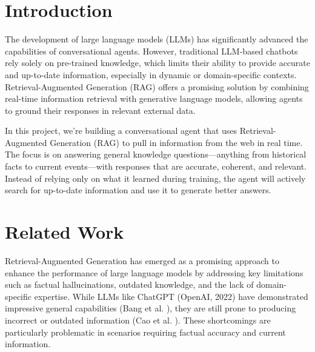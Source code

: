 \documentclass[fleqn,moreauthors,10pt]{ds_report}
\affiliation{\textit{Advisors: Aleš Žagar}}
\begin{document}
\flushbottom 

\maketitle 

\thispagestyle{empty} 


\section*{Introduction}

The development of large language models (LLMs) has significantly advanced the capabilities of conversational agents. However, traditional LLM-based chatbots rely solely on pre-trained knowledge, which limits their ability to provide accurate and up-to-date information, especially in dynamic or domain-specific contexts. Retrieval-Augmented Generation (RAG) offers a promising solution by combining real-time information retrieval with generative language models, allowing agents to ground their responses in relevant external data.

In this project, we’re building a conversational agent that uses Retrieval-Augmented Generation (RAG) to pull in information from the web in real time. The focus is on answering general knowledge questions—anything from historical facts to current events—with responses that are accurate, coherent, and relevant. Instead of relying only on what it learned during training, the agent will actively search for up-to-date information and use it to generate better answers.

\section*{Related Work}

Retrieval-Augmented Generation has emerged as a promising approach to enhance the performance of large language models by addressing key limitations such as factual hallucinations, outdated knowledge, and the lack of domain-specific expertise. While LLMs like ChatGPT (OpenAI, 2022) have demonstrated impressive general capabilities (Bang et al. \cite{bang}), they are still prone to producing incorrect or outdated information (Cao et al. \cite{cao}). These shortcomings are particularly problematic in scenarios requiring factual accuracy and current information.
\end{document}
